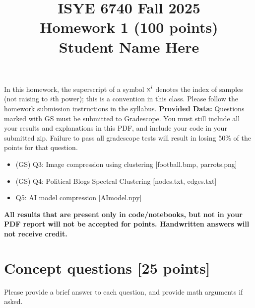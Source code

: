 \documentclass[twoside,10pt]{article}
\begin{document}
\title{ISYE 6740 Fall 2025\\ Homework 1 (100 points)\\Student Name Here}
\date{}

\maketitle

\vspace{-.5in}

In this homework, the superscript of a symbol $\text x^i$ denotes the index of samples (not raising to $i$th power); this is a convention in this class. Please follow the homework submission instructions in the syllabus.
\newline
\newline
\textbf{Provided Data:}
Questions marked with GS must be submitted to Gradescope. You must still include all your results and explanations in this PDF, and include your code in your submitted zip. Failure to pass all gradescope tests will result in losing 50\% of the points for that question.
\begin{itemize}
    \item (GS) Q3: Image compression using clustering [football.bmp, parrots.png]
    \item (GS) Q4: Political Blogs Spectral Clustering [nodes.txt, edges.txt]
    \item Q5: AI model compression [AImodel.npy]
\end{itemize}

\leavevmode\newline
\textbf{All results that are present only in code/notebooks, but not in your PDF report will not be accepted for points. Handwritten answers will not receive credit.}


\section{Concept questions [25 points]}

Please provide a brief answer to each question, and provide math arguments if asked. 
\end{document}
